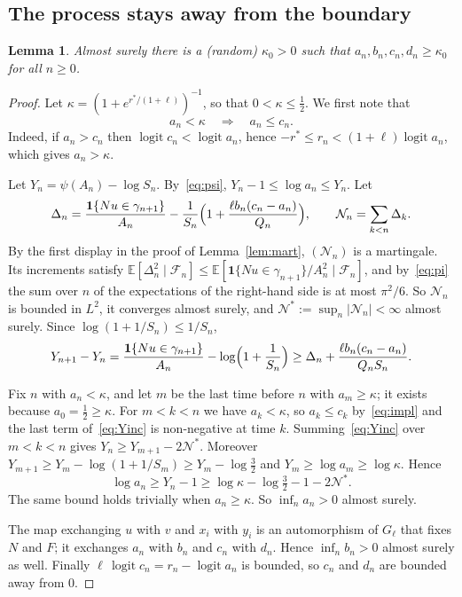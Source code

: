\documentclass[11pt]{amsart}
\newtheorem{lemma}[theorem]{Lemma}
\theoremstyle{remark}
\newcommand{\EE}{\mathbb{E}}
\newcommand{\cF}{\mathcal{F}}
\newcommand{\one}{\mathbf{1}}
\newcommand{\logit}{\operatorname{logit}}
\begin{document}
\subsection{The process stays away from the boundary}

\begin{lemma}\label{lem:away}
Almost surely there is a (random) $\kappa_0>0$ such that $a_n,b_n,c_n,d_n\ge\kappa_0$ for all $n\ge0$.
\end{lemma}
\begin{proof}
Let $\kappa=(1+e^{r^*/(1+\ell)})^{-1}$, so that $0<\kappa\le\frac12$. We first note that
\begin{equation}\label{eq:impl}
a_n<\kappa\quad\Longrightarrow\quad a_n\le c_n .
\end{equation}
Indeed, if $a_n>c_n$ then $\logit c_n<\logit a_n$, hence $-r^*\le r_n<(1+\ell)\logit a_n$, which gives $a_n>\kappa$.

Let $Y_n=\psi(A_n)-\log S_n$. By~\eqref{eq:psi}, $Y_n-1\le\log a_n\le Y_n$. Let
\[
\Delta_n=\frac{\one\{Nu\in\gamma_{n+1}\}}{A_n}-\frac1{S_n}\Bigl(1+\frac{\ell b_n(c_n-a_n)}{Q_n}\Bigr),\qquad
\mathcal N_n=\sum_{k<n}\Delta_k .
\]
By the first display in the proof of Lemma~\ref{lem:mart}, $(\mathcal N_n)$ is a martingale. Its increments satisfy
$\EE[\Delta_n^2\mid\cF_n]\le\EE[\one\{Nu\in\gamma_{n+1}\}/A_n^2\mid\cF_n]$, and by~\eqref{eq:pi} the sum over $n$ of the
expectations of the right-hand side is at most $\pi^2/6$. So $\mathcal N_n$ is bounded in $L^2$, it converges almost
surely, and $\mathcal N^*:=\sup_n|\mathcal N_n|<\infty$ almost surely. Since $\log(1+1/S_n)\le1/S_n$,
\begin{equation}\label{eq:Yinc}
Y_{n+1}-Y_n=\frac{\one\{Nu\in\gamma_{n+1}\}}{A_n}-\log\Bigl(1+\frac1{S_n}\Bigr)
\ge\Delta_n+\frac{\ell b_n(c_n-a_n)}{Q_nS_n} .
\end{equation}

Fix $n$ with $a_n<\kappa$, and let $m$ be the last time before $n$ with $a_m\ge\kappa$; it exists because
$a_0=\frac12\ge\kappa$. For $m<k<n$ we have $a_k<\kappa$, so $a_k\le c_k$ by~\eqref{eq:impl} and the last term
of~\eqref{eq:Yinc} is non-negative at time $k$. Summing~\eqref{eq:Yinc} over $m<k<n$ gives
$Y_n\ge Y_{m+1}-2\mathcal N^*$. Moreover $Y_{m+1}\ge Y_m-\log(1+1/S_m)\ge Y_m-\log\frac32$ and
$Y_m\ge\log a_m\ge\log\kappa$. Hence
\[
\log a_n\ge Y_n-1\ge\log\kappa-\log\tfrac32-1-2\mathcal N^* .
\]
The same bound holds trivially when $a_n\ge\kappa$. So $\inf_na_n>0$ almost surely.

The map exchanging $u$ with $v$ and $x_i$ with $y_i$ is an automorphism of $G_\ell$ that fixes $N$ and $F$; it
exchanges $a_n$ with $b_n$ and $c_n$ with $d_n$. Hence $\inf_nb_n>0$ almost surely as well. Finally
$\ell\,\logit c_n=r_n-\logit a_n$ is bounded, so $c_n$ and $d_n$ are bounded away from $0$.
\end{proof}
\end{document}
